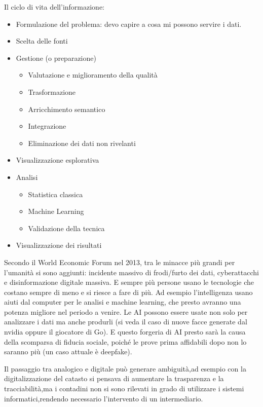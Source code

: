 \documentclass[a4page, 11pt]{article}
\begin{document}
Il ciclo di vita dell'informazione:

\begin{itemize}
	\item
	Formulazione del problema: devo capire a cosa mi possono servire i
	dati.
	\item
	Scelta delle fonti
	\item
	Gestione (o preparazione)
	
	\begin{itemize}
		 
		\item
		Valutazione e miglioramento della qualità
		\item
		Trasformazione
		\item
		Arricchimento semantico
		\item
		Integrazione
		\item
		Eliminazione dei dati non rivelanti
	\end{itemize}
	\item
	Visualizzazione esplorativa
	\item
	Analisi
	
	\begin{itemize}
		 
		\item
		Statistica classica
		\item
		Machine Learning
		\item
		Validazione della tecnica
	\end{itemize}
	\item
	Visualizzazione dei risultati
\end{itemize}

Secondo il World Economic Forum nel 2013, tra le minacce più grandi per
l'umanità si sono aggiunti: incidente massivo di frodi/furto dei dati,
cyberattacchi e disinformazione digitale massiva. E sempre più persone
usano le tecnologie che costano sempre di meno e si riesce a fare di
più. Ad esempio l'intelligenza usano aiuti dal computer per le analisi e
machine learning, che presto avranno una potenza migliore nel periodo a
venire. Le AI possono essere usate non solo per analizzare i dati ma
anche produrli (si veda il caso di nuove facce generate dal nvidia
oppure il giocatore di Go). E questo forgeria di AI presto sarà la causa
della scomparsa di fiducia sociale, poiché le prove prima affidabili
dopo non lo saranno più (un caso attuale è deepfake).

Il passaggio tra analogico e digitale può generare ambiguità,ad esempio
con la digitalizzazione del catasto si pensava di aumentare la trasparenza
e la tracciabilità,ma i contadini non si sono rilevati in grado di
utilizzare i sistemi informatici,rendendo necessario l'intervento
di un intermediario.
\end{document}
